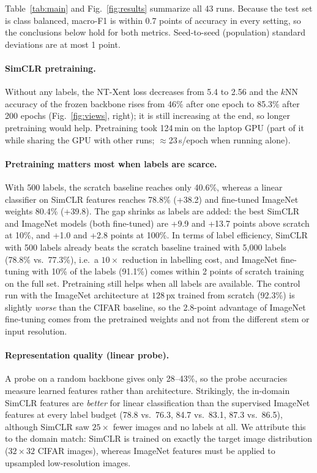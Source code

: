\documentclass[10pt,a4paper]{article}
\begin{document}
Table~\ref{tab:main} and Fig.~\ref{fig:results} summarize all 43 runs. Because the test set is
class balanced, macro-F1 is within 0.7 points of accuracy in every setting, so the conclusions below
hold for both metrics. Seed-to-seed (population) standard deviations are at most 1 point.

\paragraph{SimCLR pretraining.} Without any labels, the NT-Xent loss decreases from 5.4 to 2.56
and the $k$NN accuracy of the frozen backbone rises from 46\% after one epoch to 85.3\% after 200
epochs (Fig.~\ref{fig:views}, right); it is still increasing at the end, so longer pretraining
would help. Pretraining took 124\,min on the laptop GPU (part of it while sharing the GPU with
other runs; $\approx$23\,s/epoch when running alone).

\paragraph{Pretraining matters most when labels are scarce.} With 500 labels, the scratch
baseline reaches only 40.6\%, whereas a linear classifier on SimCLR features reaches 78.8\%
(+38.2) and fine-tuned ImageNet weights 80.4\% (+39.8). The gap shrinks as labels are added: the best SimCLR and ImageNet models (both fine-tuned) are
+9.9 and +13.7 points above scratch at 10\%, and +1.0 and +2.8 points at 100\%. In terms of
label efficiency, SimCLR with 500 labels already beats the scratch baseline trained with 5{,}000
labels (78.8\% vs.\ 77.3\%), i.e.\ a $10\times$ reduction in labelling cost, and ImageNet fine-tuning
with 10\% of the labels (91.1\%) comes within 2 points of scratch training on the full set.
Pretraining still helps when all labels are available.
The control run with the ImageNet architecture at $128$\,px trained from scratch (92.3\%) is
slightly \emph{worse} than the CIFAR baseline, so the 2.8-point advantage of ImageNet fine-tuning
comes from the pretrained weights and not from the different stem or input resolution.

\paragraph{Representation quality (linear probe).} A probe on a random backbone gives
only 28--43\%, so the probe accuracies measure learned features rather than architecture.
Strikingly, the in-domain SimCLR features are \emph{better} for linear classification than the
supervised ImageNet features at every label budget (78.8 vs.\ 76.3, 84.7 vs.\ 83.1, 87.3 vs.\ 86.5),
although SimCLR saw $25\times$ fewer images and no labels at all. We attribute this to the domain
match: SimCLR is trained on exactly the target image distribution ($32\times32$ CIFAR images),
whereas ImageNet features must be applied to upsampled low-resolution images.
\end{document}
